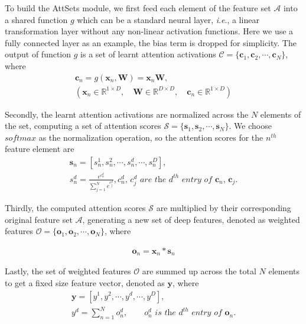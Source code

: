 \documentclass[twocolumn]{svjour3}    \pdfoutput=1
\newcommand{\nickname}{AttSets}
\newcommand{\ie}{\textit{i}.\textit{e}., }
\begin{document}
To build the \nickname{} module, we first feed each element of the feature set $\mathcal{A}$ into a shared function $g$ which can be a standard neural layer, \ie a linear transformation layer without any non-linear activation functions. Here we use a fully connected layer as an example, the bias term is dropped for simplicity. The output of function $g$ is a set of learnt attention activations $\mathcal{C}=\{\boldsymbol{c}_1, \boldsymbol{c}_2, \cdots, \boldsymbol{c}_N\}$, where
\begin{equation}
\begin{gathered}
\boldsymbol{c}_n = g(\boldsymbol{x}_n, \boldsymbol{W}) = \boldsymbol{x}_n\boldsymbol{W},\\ 
(\boldsymbol{x}_n \in \mathbb{R}^{1\times D}, \quad \boldsymbol{W} \in \mathbb{R}^{D\times D}, \quad \boldsymbol{c}_n \in \mathbb{R}^{1\times D} )
\end{gathered}
\end{equation}

Secondly, the learnt attention activations are normalized across the $N$ elements of the set, computing a set of attention scores $\mathcal{S}=\{\boldsymbol{s}_1, \boldsymbol{s}_2, \cdots, \boldsymbol{s}_N\}$. We choose $softmax$ as the normalization operation, so the attention scores for the $n^{th}$ feature element are
\begin{equation}
\begin{gathered}
\boldsymbol{s}_n = [s^1_n, s^2_n, \cdots, s^d_n, \cdots, s^D_n],\\
s^d_n = \frac{e^{c^d_n}}{\sum^N_{j=1}{ e^{c^d_j}}}, \textit{$c^d_n$, $c^d_j$ are the $d^{th}$ entry of $\boldsymbol{c}_n$, $\boldsymbol{c}_j$.}
\end{gathered}
\end{equation}

Thirdly, the computed attention scores $\mathcal{S}$ are multiplied by their corresponding original feature set $\mathcal{A}$, generating a new set of deep features, denoted as weighted features $\mathcal{O}=\{\boldsymbol{o}_1, \boldsymbol{o}_2, \cdots, \boldsymbol{o}_N\}$, where
\begin{ceqn}
\begin{align}
\boldsymbol{o}_n = \boldsymbol{x}_n * \boldsymbol{s}_n
\end{align}
\end{ceqn}

Lastly, the set of weighted features $\mathcal{O}$ are summed up across the total $N$ elements to get a fixed size feature vector, denoted as $\boldsymbol{y}$, where
\begin{equation}
\begin{gathered}
\boldsymbol{y} =[y^1, y^2, \cdots, y^d, \cdots, y^D],\\
y^d = \sum^N_{n=1}o^d_n, \qquad \textit{$o^d_n$ is the $d^{th}$ entry of $\boldsymbol{o}_n$.}
\end{gathered}
\end{equation}
\end{document}
